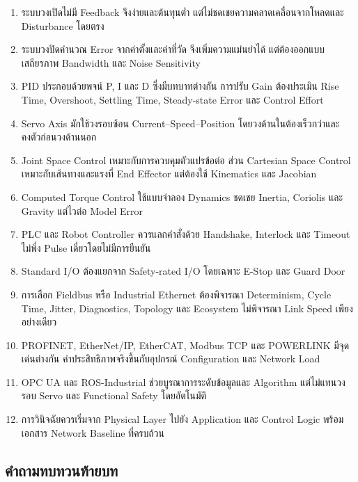 \begin{enumerate}
    \item ระบบวงเปิดไม่มี Feedback จึงง่ายและต้นทุนต่ำ แต่ไม่ชดเชยความคลาดเคลื่อนจากโหลดและ Disturbance โดยตรง
    \item ระบบวงปิดคำนวณ Error จากค่าตั้งและค่าที่วัด จึงเพิ่มความแม่นยำได้ แต่ต้องออกแบบเสถียรภาพ Bandwidth และ Noise Sensitivity
    \item PID ประกอบด้วยพจน์ P, I และ D ซึ่งมีบทบาทต่างกัน การปรับ Gain ต้องประเมิน Rise Time, Overshoot, Settling Time, Steady-state Error และ Control Effort
    \item Servo Axis มักใช้วงรอบซ้อน Current–Speed–Position โดยวงด้านในต้องเร็วกว่าและคงตัวก่อนวงด้านนอก
    \item Joint Space Control เหมาะกับการควบคุมตัวแปรข้อต่อ ส่วน Cartesian Space Control เหมาะกับเส้นทางและแรงที่ End Effector แต่ต้องใช้ Kinematics และ Jacobian
    \item Computed Torque Control ใช้แบบจำลอง Dynamics ชดเชย Inertia, Coriolis และ Gravity แต่ไวต่อ Model Error
    \item PLC และ Robot Controller ควรแลกคำสั่งด้วย Handshake, Interlock และ Timeout ไม่พึ่ง Pulse เดี่ยวโดยไม่มีการยืนยัน
    \item Standard I/O ต้องแยกจาก Safety-rated I/O โดยเฉพาะ E-Stop และ Guard Door
    \item การเลือก Fieldbus หรือ Industrial Ethernet ต้องพิจารณา Determinism, Cycle Time, Jitter, Diagnostics, Topology และ Ecosystem ไม่พิจารณา Link Speed เพียงอย่างเดียว
    \item PROFINET, EtherNet/IP, EtherCAT, Modbus TCP และ POWERLINK มีจุดเด่นต่างกัน ค่าประสิทธิภาพจริงขึ้นกับอุปกรณ์ Configuration และ Network Load
    \item OPC UA และ ROS-Industrial ช่วยบูรณาการระดับข้อมูลและ Algorithm แต่ไม่แทนวงรอบ Servo และ Functional Safety โดยอัตโนมัติ
    \item การวินิจฉัยควรเริ่มจาก Physical Layer ไปยัง Application และ Control Logic พร้อมเอกสาร Network Baseline ที่ครบถ้วน
\end{enumerate}



\subsection{คำถามทบทวนท้ายบท}

